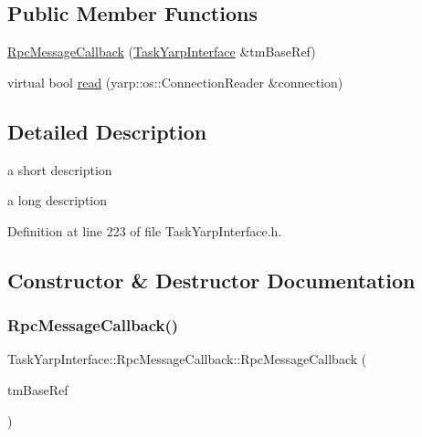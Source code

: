 \subsection*{Public Member Functions}
\begin{DoxyCompactItemize}
\item 
\hyperlink{classocra_1_1TaskYarpInterface_1_1RpcMessageCallback_a2e2770ed9acd291947f2a96fd7bba1d9}{Rpc\+Message\+Callback} (\hyperlink{classocra_1_1TaskYarpInterface}{Task\+Yarp\+Interface} \&tm\+Base\+Ref)
\item 
virtual bool \hyperlink{classocra_1_1TaskYarpInterface_1_1RpcMessageCallback_a403b0136f2df7ec64af9906560ff113e}{read} (yarp\+::os\+::\+Connection\+Reader \&connection)
\end{DoxyCompactItemize}


\subsection{Detailed Description}
a short description 

a long description 

Definition at line 223 of file Task\+Yarp\+Interface.\+h.



\subsection{Constructor \& Destructor Documentation}
\hypertarget{classocra_1_1TaskYarpInterface_1_1RpcMessageCallback_a2e2770ed9acd291947f2a96fd7bba1d9}{}\label{classocra_1_1TaskYarpInterface_1_1RpcMessageCallback_a2e2770ed9acd291947f2a96fd7bba1d9} 
\subsubsection{\texorpdfstring{Rpc\+Message\+Callback()}{RpcMessageCallback()}}
{\footnotesize\ttfamily Task\+Yarp\+Interface\+::\+Rpc\+Message\+Callback\+::\+Rpc\+Message\+Callback (\begin{DoxyParamCaption}\item[{\hyperlink{classocra_1_1TaskYarpInterface}{Task\+Yarp\+Interface} \&}]{tm\+Base\+Ref }\end{DoxyParamCaption})}



